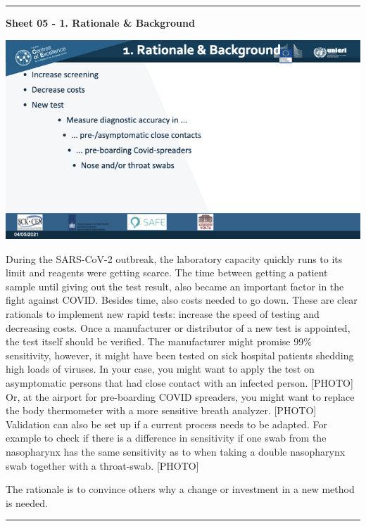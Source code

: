 \documentclass[
]{book}
\begin{document}
\begin{center}\rule{0.5\linewidth}{0.5pt}\end{center}

\textbf{Sheet 05 - 1. Rationale \& Background}

\includegraphics{images/m03/m03_validation_of_test_kits_v2_2.005.jpeg}

During the SARS-CoV-2 outbreak, the laboratory capacity quickly runs to
its limit and reagents were getting scarce. The time between getting a
patient sample until giving out the test result, also became an
important factor in the fight against COVID. Besides time, also costs
needed to go down. These are clear rationals to implement new rapid
tests: increase the speed of testing and decreasing costs. Once a
manufacturer or distributor of a new test is appointed, the test itself
should be verified. The manufacturer might promise 99\% sensitivity,
however, it might have been tested on sick hospital patients shedding
high loads of viruses. In your case, you might want to apply the test on
asymptomatic persons that had close contact with an infected person.
{[}PHOTO{]} Or, at the airport for pre-boarding COVID spreaders, you might
want to replace the body thermometer with a more sensitive breath
analyzer. {[}PHOTO{]} Validation can also be set up if a current process
needs to be adapted. For example to check if there is a difference in
sensitivity if one swab from the nasopharynx has the same sensitivity as
to when taking a double nasopharynx swab together with a throat-swab.
{[}PHOTO{]}

The rationale is to convince others why a change or investment in a new
method is needed.

\begin{center}\rule{0.5\linewidth}{0.5pt}\end{center}
\end{document}
